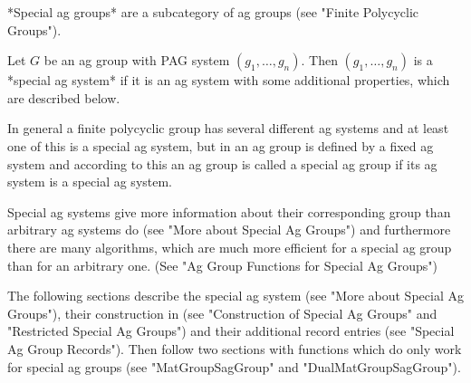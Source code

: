 


*Special ag groups* are a subcategory of ag groups (see "Finite
Polycyclic Groups").

Let $G$ be an ag group with PAG system $(g_1, \ldots, g_n)$.
Then $(g_1, \ldots, g_n)$ is a *special ag system* if it is an ag system
with some additional properties, which are described below.

In general a finite polycyclic group has several different ag systems and
at least one of this is a special ag system, but in {\GAP} an ag group is
defined by a fixed ag system and according to this an ag group is called
a special ag group if its ag system is a special ag system.

Special ag systems give more information about their corresponding group
than arbitrary ag systems do (see "More about Special Ag Groups") and
furthermore there are many algorithms, which are much more efficient for
a special ag group than for an arbitrary one. (See "Ag Group Functions
for Special Ag Groups")

The following sections describe the special ag system (see "More about
Special Ag Groups"), their construction in {\GAP} (see "Construction of
Special Ag Groups" and "Restricted Special Ag Groups") and their
additional record entries (see "Special Ag Group Records"). Then follow
two sections with functions which do only work for special ag groups (see
"MatGroupSagGroup" and "DualMatGroupSagGroup").


